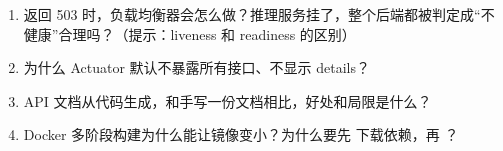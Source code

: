 \begin{think}
\begin{enumerate}
  \item {} 返回 503 时，负载均衡器会怎么做？推理服务挂了，整个后端都被判定成“不健康”合理吗？（提示：liveness 和 readiness 的区别）
  \item 为什么 Actuator 默认不暴露所有接口、不显示 details？
  \item API 文档从代码生成，和手写一份文档相比，好处和局限是什么？
  \item Docker 多阶段构建为什么能让镜像变小？为什么要先  下载依赖，再 ？
\end{enumerate}
\end{think}
